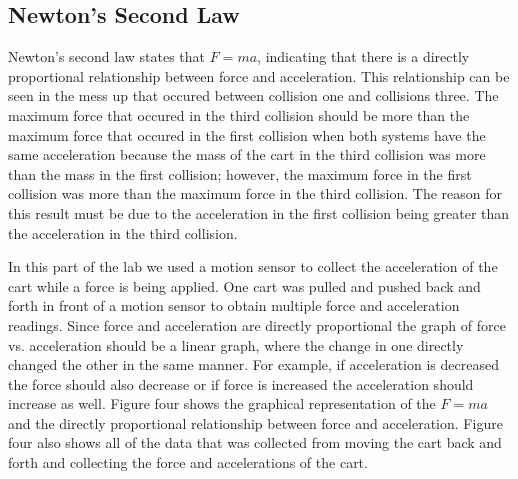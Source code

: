\documentclass[aps,letterpaper,11pt]{revtex4}
\begin{document}
\subsection{Newton's Second Law}   

Newton's second law states that $F = ma$, indicating that there is a directly proportional relationship between force and acceleration. This relationship can be seen in the mess up that occured between collision one and collisions three. The maximum force that occured in the third collision should be more than the maximum force that occured in the first collision when both systems have the same acceleration because the mass of the cart in the third collision was more than the mass in the first collision; however, the maximum force in the first collision was more than the maximum force in the third collision. The reason for this result must be due to the acceleration in the first collision being greater than the acceleration in the third collision.  

In this part of the lab we used a motion sensor to collect the acceleration of the cart while a force is being applied. One cart was pulled and pushed back and forth in front of a motion sensor to obtain multiple force and acceleration readings. Since force and acceleration are directly proportional the graph of force vs. acceleration should be a linear graph, where the change in one directly changed the other in the same manner. For example, if acceleration is decreased the force should also decrease or if force is increased the acceleration should increase as well. Figure four shows the graphical representation of the $F = ma$ and the directly proportional relationship between force and acceleration. Figure four also shows all of the data that was collected from moving the cart back and forth and collecting the force and accelerations of the cart. 
\end{document}
